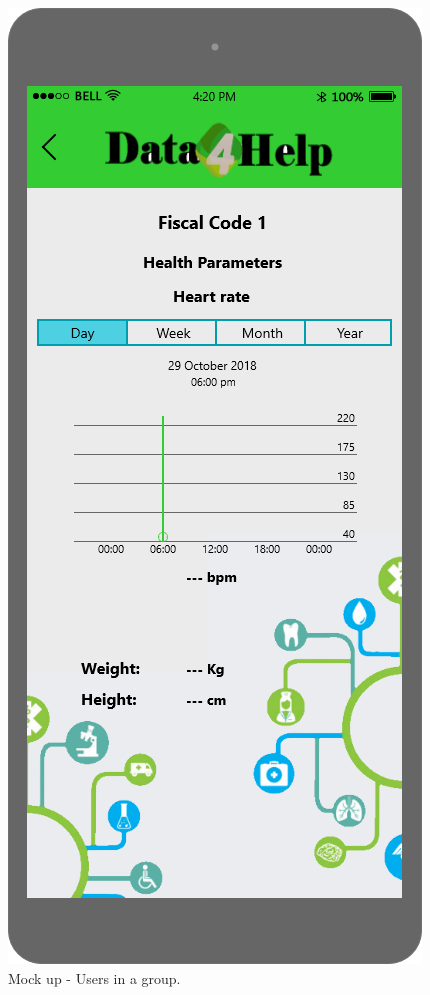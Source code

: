 \begin{figure}[h!]
\begin{minipage}[b]{0.25\textwidth}
    		\caption{Mock up - Users in a group.}
	\end{minipage}
	\hfill
	\begin{minipage}[b]{0.25\textwidth}
    		\includegraphics[width=\textwidth]{./pictures/user1.png}

\end{minipage}
\end{figure}
